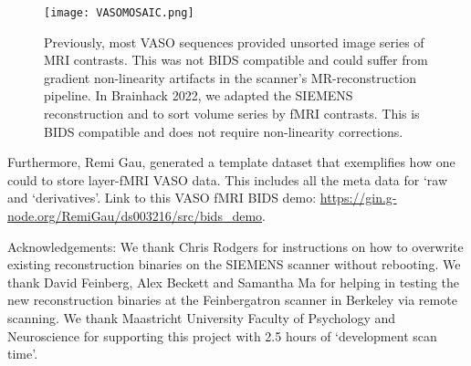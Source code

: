 \documentclass[../main.tex]{subfiles}
\begin{document}
\begin{figure}
	\centering
	\texttt{[image: VASOMOSAIC.png]}
	\caption{Previously, most VASO sequences provided unsorted image series of MRI contrasts. This was not BIDS compatible and could suffer from gradient non-linearity artifacts in the scanner’s MR-reconstruction pipeline. In Brainhack 2022, we adapted the SIEMENS reconstruction and to sort volume series by fMRI contrasts. This is BIDS compatible and does not require non-linearity corrections.
}
	\label{fig:VASOMOSAIC}
\end{figure}

Furthermore, Remi Gau, generated a template dataset that exemplifies how one could to store layer-fMRI VASO data. This includes all the meta data for `raw and `derivatives'. Link to this VASO fMRI BIDS demo: \url{https://gin.g-node.org/RemiGau/ds003216/src/bids_demo}.

Acknowledgements: We thank Chris Rodgers for instructions on how to overwrite existing reconstruction binaries on the SIEMENS scanner without rebooting. We thank David Feinberg, Alex Beckett and Samantha Ma for helping in testing the new reconstruction binaries at the Feinbergatron scanner in Berkeley via remote scanning. We thank Maastricht University Faculty of Psychology and Neuroscience for supporting this project with 2.5 hours of `development scan time'.
\end{document}
